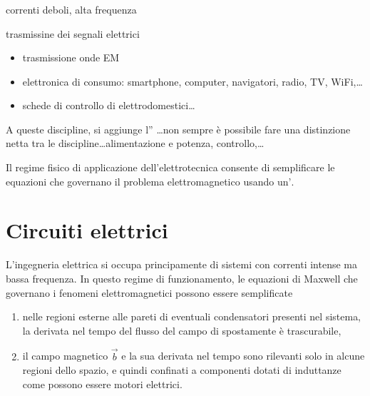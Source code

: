 \documentclass[letterpaper,10pt,italian]{jupyterBook}
\begin{document}
\subsubsection*{}

\sphinxAtStartPar
{} correnti deboli, alta frequenza

\sphinxAtStartPar
{} trasmissine dei segnali elettrici
\begin{itemize}
\item {} 
\sphinxAtStartPar
trasmissione onde EM

\item {} 
\sphinxAtStartPar
elettronica di consumo: smartphone, computer, navigatori, radio, TV, Wi\sphinxhyphen{}Fi,…

\item {} 
\sphinxAtStartPar
schede di controllo di elettrodomestici…

\end{itemize}

\sphinxAtStartPar
A queste discipline, si aggiunge l” …non sempre è possibile fare una distinzione netta tra le discipline…alimentazione e potenza, controllo,…

\sphinxAtStartPar
Il regime fisico di applicazione dell’elettrotecnica consente di semplificare le equazioni che governano il problema elettromagnetico usando un\(\text{'}\).

\sphinxstepscope


\section{Circuiti elettrici}
\label{\detokenize{ch/electromagnetism/circuits-electric:circuiti-elettrici}}\label{\detokenize{ch/electromagnetism/circuits-electric:physics-hs-electromagnetism-circuits-electric}}\label{\detokenize{ch/electromagnetism/circuits-electric::doc}}
\sphinxAtStartPar
L’ingegneria elettrica si occupa principamente di sistemi con correnti intense ma bassa frequenza. In questo regime di funzionamento, le equazioni di Maxwell che governano i fenomeni elettromagnetici possono essere semplificate
\begin{enumerate}
%
\item {} 
\sphinxAtStartPar
nelle regioni esterne alle pareti di eventuali condensatori presenti nel sistema, la derivata nel tempo del flusso del campo di spostamente è trascurabile,

\item {} 
\sphinxAtStartPar
il campo magnetico \(\vec{b}\) e la sua derivata nel tempo sono rilevanti solo in alcune regioni dello spazio, e quindi confinati a componenti dotati di induttanze \sphinxhyphen{} come possono essere motori elettrici.

\end{enumerate}
\end{document}
